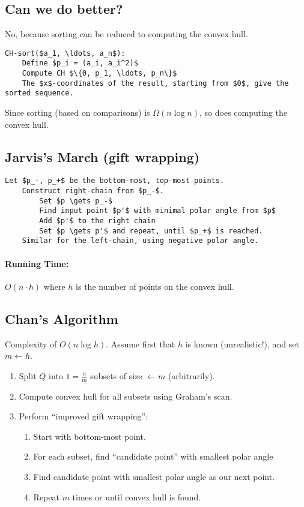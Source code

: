 \subsection{Can we do better?}

No, because sorting can be reduced to computing the convex hull.

\begin{lstlisting}[mathescape]
CH-sort($a_1, \ldots, a_n$):
	Define $p_i = (a_i, a_i^2)$
	Compute CH $\{0, p_1, \ldots, p_n\}$
	The $x$-coordinates of the result, starting from $0$, give the sorted sequence.
\end{lstlisting}

Since sorting (based on comparisons) is $\Omega (n \log n)$, so does computing the convex hull.

\subsection{Jarvis's March (gift wrapping)}

\begin{lstlisting}[mathescape]
	Let $p_-, p_+$ be the bottom-most, top-most points.
	Construct right-chain from $p_-$.
		Set $p \gets p_-$
		Find input point $p'$ with minimal polar angle from $p$
		Add $p'$ to the right chain
		Set $p \gets p'$ and repeat, until $p_+$ is reached.
	Similar for the left-chain, using negative polar angle.
\end{lstlisting}

\paragraph{Running Time:} $O(n \cdot h)$ where $h$ is the number of points on the convex hull.

\subsection{Chan's Algorithm}Complexity of $O(n \log h)$. Assume first that $h$ is known (unrealistic!), and set $m \gets h$.

\begin{enumerate}
	\item Split $Q$ into $1 = \frac{n}{m}$ subsets of size $\gets m$ (arbitrarily).
	\item Compute convex hull for all subsets using Graham's scan.
	\item Perform ``improved gift wrapping'':
	\begin{enumerate}
		\item Start with bottom-most point.
		\item For each subset, find ``candidate point'' with smallest polar angle
		\item Find candidate point with smallest polar angle as our next point.
		\item Repeat $m$ times or until convex hull is found.
	\end{enumerate}
\end{enumerate}

